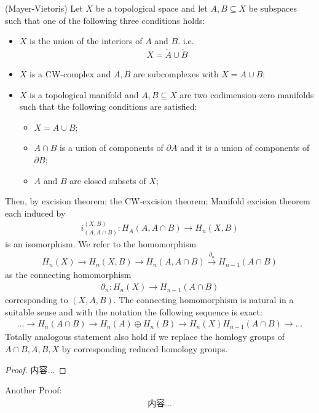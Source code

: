 \documentclass[Total.tex]{subfiles}
\begin{document}
		\begin{theorem}
			(Mayer-Vietoris) Let $X$ be a topological space and let $A,B\subseteq X$ be subspaces such that one of the following three conditions holds:
			\begin{itemize}
				\item $X$ is the union of the interiors of $A$ and $B$. i.e.
				\begin{gather*}
					X=\mathring{A}\cup \mathring{B}
				\end{gather*}
				\item $X$ is a CW-complex and $A,B$ are subcomplexes with $X=A\cup B$;
				\item $X$ is a topological manifold and $A,B\subseteq X$ are two codimension-zero manifolds such that the following conditions are satisfied:
				\begin{itemize}
					\item $X=A\cup B$;
					\item $A\cap B$ is a union of components of $\partial A$ and it is a union of components of $\partial B$;
					\item $A$ and $B$ are closed subsets of $X$;
				\end{itemize}
			\end{itemize}
			Then, by excision theorem; the CW-excision theorem; Manifold excision theorem each induced by
			\begin{gather*}
				i_{(A,A\cap B)}^{(X,B)}:H_A(A,A\cap B)\rightarrow H_n(X,B)
			\end{gather*}
			is an isomorphism. We refer to the homomorphism
			\begin{gather*}
				H_n(X)\stackrel{}{\rightarrow} H_n(X,B)\stackrel{}{\rightarrow} H_n(A,A\cap B)\stackrel{\partial_n}{
				\rightarrow} H_{n-1}(A\cap B)
			\end{gather*}
			as the connecting homomorphism\begin{gather*}
				\partial_n:H_n(X)\rightarrow H_{n-1}(A\cap B)
			\end{gather*}
			corresponding to $(X,A,B)$. The connecting homomorphism is natural in a suitable sense and with the notation the following sequence is exact:
			\begin{gather*}
				\dots\rightarrow H_n(A\cap B)\stackrel{}{\rightarrow} H_n(A)\oplus H_n(B)\stackrel{}{\rightarrow} H_n(X)\stackrel{}{}H_{n-1}(A\cap B)\rightarrow \dots
			\end{gather*}
			Totally analogous statement also hold if we replace the homlogy groups of $A\cap B,A,B,X$ by corresponding reduced homology groups.
		\end{theorem}
		\begin{proof}
			内容...
		\end{proof}
		Another Proof:
		\begin{gather*}
			内容...
		\end{gather*}
		
\end{document}

